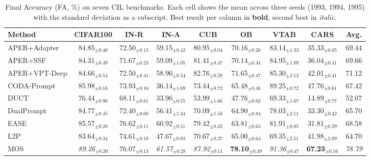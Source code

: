 \begin{table}[!t]
\centering
\caption{Final Accuracy (FA, \%) on seven CIL benchmarks. Each cell shows the mean across three seeds (1993, 1994, 1995) with the standard deviation as a subscript. Best result per column in \textbf{bold}, second best in \textit{italic}.}
\label{tab:overall-fa-standalone}
\renewcommand{\arraystretch}{0.95}
\begin{adjustbox}{max width=\textwidth}
\footnotesize
\begin{tabular}{l c c c c c c c c}
\toprule
Method & \textbf{CIFAR100} & \textbf{IN-R} & \textbf{IN-A} & \textbf{CUB} & \textbf{OB} & \textbf{VTAB} & \textbf{CARS} & \textbf{Avg.} \\
\midrule
APER+Adapter & 84.85$_{\pm 0.40}$ & 72.50$_{\pm 0.15}$ & 59.15$_{\pm 0.42}$ & 80.95$_{\pm 0.04}$ & 70.16$_{\pm 0.20}$ & 83.14$_{\pm 1.33}$ & 35.33$_{\pm 0.05}$ & 69.44 \\
APER+SSF & 84.31$_{\pm 0.49}$ & 71.67$_{\pm 0.23}$ & 59.09$_{\pm 1.05}$ & 81.41$_{\pm 0.47}$ & 70.14$_{\pm 0.34}$ & 84.95$_{\pm 1.09}$ & 36.04$_{\pm 0.41}$ & 69.66 \\
APER+VPT-Deep & 84.66$_{\pm 0.54}$ & 72.50$_{\pm 0.41}$ & 58.96$_{\pm 0.54}$ & 82.76$_{\pm 0.28}$ & 71.65$_{\pm 0.47}$ & 85.30$_{\pm 2.12}$ & 42.01$_{\pm 0.41}$ & 71.12 \\
CODA-Prompt & 85.98$_{\pm 0.16}$ & 73.93$_{\pm 0.16}$ & 36.14$_{\pm 1.69}$ & 73.44$_{\pm 0.72}$ & 65.48$_{\pm 0.46}$ & 89.25$_{\pm 0.72}$ & 47.76$_{\pm 0.61}$ & 67.42 \\
DUCT & 76.44$_{\pm 0.96}$ & 68.11$_{\pm 0.81}$ & 33.96$_{\pm 0.55}$ & 53.99$_{\pm 1.66}$ & 47.76$_{\pm 0.62}$ & 69.33$_{\pm 1.67}$ & 14.89$_{\pm 0.77}$ & 52.07 \\
DualPrompt & 84.77$_{\pm 0.45}$ & 72.40$_{\pm 0.60}$ & 56.41$_{\pm 1.34}$ & 70.09$_{\pm 1.58}$ & 64.90$_{\pm 0.84}$ & 78.03$_{\pm 2.11}$ & 33.30$_{\pm 0.42}$ & 65.70 \\
EASE & 85.57$_{\pm 0.28}$ & 76.62$_{\pm 0.11}$ & 60.92$_{\pm 0.51}$ & 79.42$_{\pm 0.32}$ & 63.81$_{\pm 0.63}$ & 81.91$_{\pm 0.85}$ & 31.81$_{\pm 0.29}$ & 68.58 \\
L2P & 83.64$_{\pm 0.34}$ & 74.61$_{\pm 0.18}$ & 47.67$_{\pm 0.93}$ & 70.67$_{\pm 0.37}$ & 65.00$_{\pm 0.64}$ & 69.35$_{\pm 2.51}$ & 41.98$_{\pm 2.09}$ & 64.70 \\
MOS & \textit{89.26}$_{\pm 0.20}$ & 76.07$_{\pm 0.13}$ & \textit{61.57}$_{\pm 0.28}$ & \textit{87.92}$_{\pm 0.11}$ & \textbf{78.10}$_{\pm 0.49}$ & \textit{91.36}$_{\pm 0.47}$ & \textbf{67.23}$_{\pm 0.16}$ & \textit{78.79} \\

\end{tabular}
\end{adjustbox}
\end{table}
